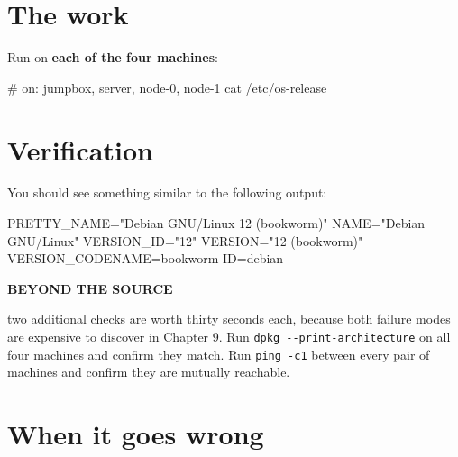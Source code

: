 \documentclass[11pt,oneside]{report}
\newcommand{\calloutlabel}[2]{{\sffamily\bfseries\footnotesize\color{#1}#2\quad}}
\begin{document}
\hypertarget{the-work}{%
\section{The
work}\label{the-work}}

Run on \textbf{each
of the four
machines}:

\begin{cmdlst}
# on: jumpbox, server, node-0, node-1
cat /etc/os-release
\end{cmdlst}

\hypertarget{verification}{%
\section{Verification}\label{verification}}

You should see
something similar to
the following
output:

\begin{outlst}
PRETTY_NAME="Debian GNU/Linux 12 (bookworm)"
NAME="Debian GNU/Linux"
VERSION_ID="12"
VERSION="12 (bookworm)"
VERSION_CODENAME=bookworm
ID=debian
\end{outlst}

\begin{beyondbox}\calloutlabel{teal}{BEYOND THE SOURCE}

two additional
checks are worth
thirty seconds each,
because both failure
modes are expensive
to discover in
Chapter 9. Run
\texttt{dpkg\ -\/-print-}\allowbreak{}\texttt{architecture}
on all four machines
and confirm they
match. Run
\texttt{ping\ -c1}
between every pair
of machines and
confirm they are
mutually reachable.

\end{beyondbox}

\hypertarget{when-it-goes-wrong}{%
\section{When it
goes
wrong}\label{when-it-goes-wrong}}
\end{document}
